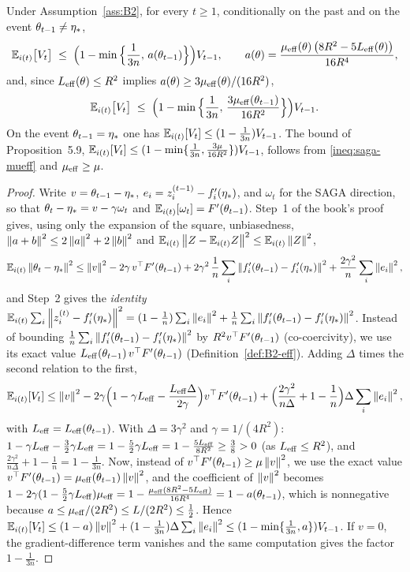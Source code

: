 \begin{proposition}\label{prop:B2-saga-traj}
Under Assumption~\ref{ass:B2}, for every $t\ge1$, conditionally on the past and on the event $\theta_{t-1}\neq\eta_\ast$,
\begin{equation}\label{ineq:saga-mueff-Leff}
\mathbb{E}_{i(t)}\big[V_t\big]\;\le\;\Big(1-\min\Big\{\frac1{3n},\,a(\theta_{t-1})\Big\}\Big)V_{t-1},
\qquad a(\theta)=\frac{\mu_{\mathrm{eff}}(\theta)\,\big(8R^2-5L_{\mathrm{eff}}(\theta)\big)}{16R^4},
\end{equation}
and, since $L_{\mathrm{eff}}(\theta)\le R^2$ implies $a(\theta)\ge3\mu_{\mathrm{eff}}(\theta)/(16R^2)$,
\begin{equation}\label{ineq:saga-mueff}
\mathbb{E}_{i(t)}\big[V_t\big]\;\le\;\Big(1-\min\Big\{\frac1{3n},\,\frac{3\mu_{\mathrm{eff}}(\theta_{t-1})}{16R^2}\Big\}\Big)V_{t-1} .
\end{equation}
On the event $\theta_{t-1}=\eta_\ast$ one has $\mathbb{E}_{i(t)}[V_t]\le(1-\frac1{3n})V_{t-1}$. The bound of
Proposition~5.9, $\mathbb{E}_{i(t)}[V_t]\le(1-\min\{\frac1{3n},\frac{3\mu}{16R^2}\})V_{t-1}$, follows from
\eqref{ineq:saga-mueff} and $\mu_{\mathrm{eff}}\ge\mu$.
\end{proposition}

\begin{proof}
Write $v=\theta_{t-1}-\eta_\ast$, $e_i=z_i^{(t-1)}-f'_i(\eta_\ast)$, and $\omega_t$ for the SAGA direction, so that
$\theta_t-\eta_\ast=v-\gamma\omega_t$ and $\mathbb{E}_{i(t)}[\omega_t]=F'(\theta_{t-1})$. Step~1 of the book's proof gives,
using only the expansion of the square, unbiasedness, $\left\|a+b\right\|^2\le2\left\|a\right\|^2+2\left\|b\right\|^2$ and
$\mathbb{E}_{i(t)}\left\|Z-\mathbb{E}_{i(t)} Z\right\|^2\le\mathbb{E}_{i(t)}\left\|Z\right\|^2$,
\[
\mathbb{E}_{i(t)}\left\|\theta_t-\eta_\ast\right\|^2\le\left\|v\right\|^2-2\gamma\,v^\top F'(\theta_{t-1})
+2\gamma^2\,\frac1n\sum_i\left\|f'_i(\theta_{t-1})-f'_i(\eta_\ast)\right\|^2+\frac{2\gamma^2}n\sum_i\left\|e_i\right\|^2 ,
\]
and Step~2 gives the \emph{identity}
$\mathbb{E}_{i(t)}\sum_i\left\|z_i^{(t)}-f'_i(\eta_\ast)\right\|^2=(1-\frac1n)\sum_i\left\|e_i\right\|^2+\frac1n\sum_i\left\|f'_i(\theta_{t-1})-f'_i(\eta_\ast)\right\|^2$.
Instead of bounding $\frac1n\sum_i\left\|f'_i(\theta_{t-1})-f'_i(\eta_\ast)\right\|^2$ by $R^2v^\top F'(\theta_{t-1})$
(co-coercivity), we use its exact value $L_{\mathrm{eff}}(\theta_{t-1})\,v^\top F'(\theta_{t-1})$ (Definition~\ref{def:B2-eff}).
Adding $\Delta$ times the second relation to the first,
\[
\mathbb{E}_{i(t)}[V_t]\le\left\|v\right\|^2-2\gamma\Big(1-\gamma L_{\mathrm{eff}}-\frac{L_{\mathrm{eff}}\Delta}{2\gamma}\Big)v^\top F'(\theta_{t-1})
+\Big(\frac{2\gamma^2}{n\Delta}+1-\frac1n\Big)\Delta\sum_i\left\|e_i\right\|^2 ,
\]
with $L_{\mathrm{eff}}=L_{\mathrm{eff}}(\theta_{t-1})$. With $\Delta=3\gamma^2$ and $\gamma=1/(4R^2)$:
$1-\gamma L_{\mathrm{eff}}-\frac32\gamma L_{\mathrm{eff}}=1-\frac52\gamma L_{\mathrm{eff}}=1-\frac{5L_{\mathrm{eff}}}{8R^2}\ge\frac38>0$ (as $L_{\mathrm{eff}}\le R^2$),
and $\frac{2\gamma^2}{n\Delta}+1-\frac1n=1-\frac1{3n}$. Now, instead of $v^\top F'(\theta_{t-1})\ge\mu\left\|v\right\|^2$,
we use the exact value $v^\top F'(\theta_{t-1})=\mu_{\mathrm{eff}}(\theta_{t-1})\left\|v\right\|^2$, and the coefficient of $\left\|v\right\|^2$
becomes $1-2\gamma(1-\frac52\gamma L_{\mathrm{eff}})\mu_{\mathrm{eff}}=1-\frac{\mu_{\mathrm{eff}}(8R^2-5L_{\mathrm{eff}})}{16R^4}=1-a(\theta_{t-1})$, which is
nonnegative because $a\le\mu_{\mathrm{eff}}/(2R^2)\le L/(2R^2)\le\frac12$. Hence
$\mathbb{E}_{i(t)}[V_t]\le(1-a)\left\|v\right\|^2+(1-\frac1{3n})\Delta\sum_i\left\|e_i\right\|^2\le(1-\min\{\frac1{3n},a\})V_{t-1}$. If $v=0$,
the gradient-difference term vanishes and the same computation gives the factor $1-\frac1{3n}$.
\end{proof}

